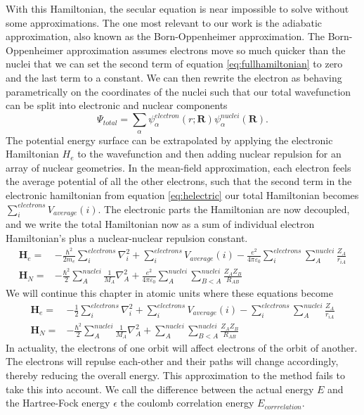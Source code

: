 With this Hamiltonian, the secular equation is near impossible to solve without some approximations.
The one most relevant to our work is the adiabatic approximation, also known as the Born-Oppenheimer approximation.
The Born-Oppenheimer approximation assumes electrons move so much quicker than the nuclei that we can set the second term of equation \ref{eq:fullhamiltonian} to zero and the last term to a constant. \cite{born1954dynamical,born1927quantentheorie}
We can then rewrite the electron as behaving parametrically on the coordinates of the nuclei such that our total wavefunction can be split into electronic and nuclear components
\begin{equation}
  \Psi_{total} = \sum_\alpha\psi_\alpha^{electron}(r;\mathbf{R})\psi_\alpha^{nuclei}(\mathbf{R}).
\end{equation}
The potential energy surface can be extrapolated by applying the electronic Hamiltonian $H_e$ to the wavefunction and then adding nuclear repulsion for an array of nuclear geometries.
In the mean-field approximation, each electron feels the average potential of all the other electrons, such that the second term in the electronic hamiltonian from equation \ref{eq:helectric} our total Hamiltonian becomes $\sum_i^{electrons} V_{average}(i)$.
The electronic parts the Hamiltonian are now decoupled, and we write the total Hamiltonian now as a sum of individual electron Hamiltonian's plus a nuclear-nuclear repulsion constant.
\begin{align}
  \label{eq:helectric}
  \mathbf{H}_e =& -\frac{\hbar^2}{2m_e}\sum_i^{electrons}\nabla_i^2 + \sum_i^{electrons} V_{average}(i) - \frac{e^2}{4\pi\varepsilon_0} \sum_i^{electrons}\sum_A^{nuclei}\frac{Z_A}{r_{iA}} \\
  \mathbf{H}_N =& -\frac{\hbar^2}{2}\sum_{A}^{nuclei}\frac{1}{M_{A}}\nabla_{A}^2  + \frac{e^2}{4\pi\varepsilon_0}\sum_{A}^{nuclei}\sum_{B<A}^{nuclei}\frac{Z_AZ_B}{R_{AB}}
\end{align}
We will continue this chapter in atomic units where these equations become
\begin{align}
  \label{eq:helectric}
  \mathbf{H}_e =& -\frac{1}{2}\sum_i^{electrons}\nabla_i^2 + \sum_i^{electrons} V_{average}(i) -  \sum_i^{electrons}\sum_A^{nuclei}\frac{Z_A}{r_{iA}} \\
  \mathbf{H}_N =& -\frac{\hbar^2}{2}\sum_{A}^{nuclei}\frac{1}{M_{A}}\nabla_{A}^2  + \sum_{A}^{nuclei}\sum_{B<A}^{nuclei}\frac{Z_AZ_B}{R_{AB}}
\end{align}
In actuality, the electrons of one orbit will affect electrons of the orbit of another.
The electrons will repulse each-other and their paths will change accordingly, thereby reducing the overall energy.
This approximation to the method fails to take this into account.
We call the difference between the actual energy $E$ and the Hartree-Fock energy $\epsilon$ the
coulomb correlation energy $E_{corrrelation}$.


